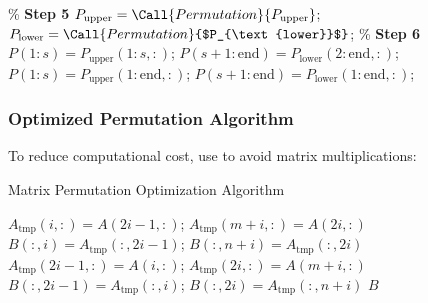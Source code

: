 \documentclass{beamer}
\begin{document}
\begin{frame}
\begin{algorithm}[H]
\begin{algorithmic}[1]
        \EndIf %
        \State
        \State \% \textbf{Step 5} 
        \State $P_{\text{upper}} = \Call{Permutation}{P_{\text{upper}}}$; %
        \State $P_{\text{lower}} = \Call{Permutation}{$P_{\text{lower}}$}$;
        \State
        \State \% \textbf{Step 6} 
            \State $P(1:s) = P_{\text{upper}}(1:s, :)$;
            \State $P(s+1:\text{end}) = P_{\text{lower}}(2:\text{end}, :)$;
        \Else
            \State $P(1:s) = P_{\text{upper}}(1:\text{end}, :)$;
            \State $P(s+1:\text{end}) = P_{\text{lower}}(1:\text{end}, :)$;
        \EndIf %
    \EndFunction %
    \end{algorithmic}
    \end{algorithm}
\end{frame}

\begin{frame}
    \frametitle{Optimized Permutation Algorithm}
    To reduce computational cost, use  to avoid matrix multiplications:
    \begin{algorithm}[H]
        \caption{Matrix Permutation Optimization Algorithm}
        \begin{algorithmic}[1]
             
                 $A_{\text{tmp}}(i,:)=A(2i-1,:)$; $A_{\text{tmp}}(m+i,:)=A(2i,:)$ \EndFor
                 $B(:,i)=A_{\text{tmp}}(:,2i-1)$; $B(:,n+i)=A_{\text{tmp}}(:,2i)$ \EndFor
            \Else {}
                 $A_{\text{tmp}}(2i-1,:)=A(i,:)$; $A_{\text{tmp}}(2i,:)=A(m+i,:)$ \EndFor
                 $B(:,2i-1)=A_{\text{tmp}}(:,i)$; $B(:,2i)=A_{\text{tmp}}(:,n+i)$ \EndFor
            \EndIf
            \Return $B$
        \EndFunction
        \end{algorithmic}
    \end{algorithm}
\end{frame}
\fi
\end{document}
